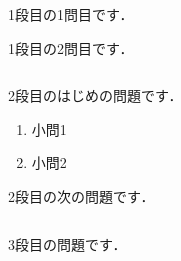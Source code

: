 \documentclass[b4paper,landscape,fleqn]{jarticle}
\begin{document}
%
%
%
%
\begin{sheet}%
  \begin{column}%
    \item 1段目の1問目です．\vspace{10cm}%
    \item 1段目の2問目です．%
  \end{column}%
  \begin{column}%
    \item 2段目のはじめの問題です．
        \begin{enumerate}%
            \item 小問1 \vspace{4.5cm}%
            \item 小問2 \vspace{4.5cm}
        \end{enumerate}
    \item 2段目の次の問題です．
  \end{column}%
  \begin{column}%
    \item 3段目の問題です．
  \end{column}%
\end{sheet}%
\end{document}
